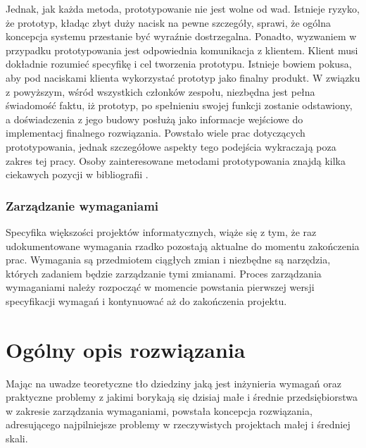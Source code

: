         Jednak, jak każda metoda, prototypowanie nie jest wolne od wad. Istnieje ryzyko, że prototyp, kładąc zbyt duży nacisk na pewne szczegóły, sprawi, że ogólna koncepcja systemu przestanie być wyraźnie dostrzegalna. Ponadto, wyzwaniem w przypadku prototypowania jest odpowiednia komunikacja z klientem. Klient musi dokładnie rozumieć specyfikę i cel tworzenia prototypu. Istnieje bowiem pokusa, aby pod naciskami klienta wykorzystać prototyp jako finalny produkt. W związku z powyższym, wśród wszystkich członków zespołu, niezbędna jest pełna świadomość faktu, iż prototyp, po spełnieniu swojej funkcji zostanie odstawiony, a doświadczenia z jego budowy posłużą jako informacje wejściowe do implementacj finalnego rozwiązania. Powstało wiele prac dotyczących prototypowania, jednak szczegółowe aspekty tego podejścia wykraczają poza zakres tej pracy. Osoby zainteresowane metodami prototypowania znajdą kilka ciekawych pozycji w bibliografii \cite{arnowitz2006effective, budde1992prototyping}.

      \subsubsection{Zarządzanie wymaganiami}

        Specyfika większości projektów informatycznych, wiąże się z tym, że raz udokumentowane wymagania rzadko pozostają aktualne do momentu zakończenia prac. Wymagania są przedmiotem ciągłych zmian i niezbędne są narzędzia, których zadaniem będzie zarządzanie tymi zmianami. Proces zarządzania wymaganiami należy rozpocząć w momencie powstania pierwszej wersji specyfikacji wymagań i kontynuować aż do zakończenia projektu.

  \section{Ogólny opis rozwiązania}

    Mając na uwadze teoretyczne tło dziedziny jaką jest inżynieria wymagań oraz praktyczne problemy z jakimi borykają się dzisiaj małe i średnie przedsiębiorstwa w zakresie zarządzania wymaganiami, powstała koncepcja rozwiązania, adresującego najpilniejsze problemy w rzeczywistych projektach małej i średniej skali. 

